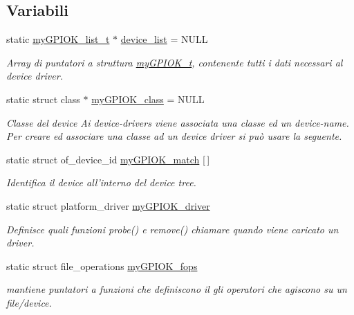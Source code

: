 \subsection*{Variabili}
\begin{DoxyCompactItemize}
\item 
static \hyperlink{structmy_g_p_i_o_k__list__t}{my\+G\+P\+I\+O\+K\+\_\+list\+\_\+t} $\ast$ \hyperlink{group___linux-_driver_ga1deed297d5c8afeb9703965d37d3be5b}{device\+\_\+list} = N\+U\+L\+L
\begin{DoxyCompactList}\small\item\em Array di puntatori a struttura \hyperlink{structmy_g_p_i_o_k__t}{my\+G\+P\+I\+O\+K\+\_\+t}, contenente tutti i dati necessari al device driver. \end{DoxyCompactList}\item 
static struct class $\ast$ \hyperlink{group___linux-_driver_gaaf8d1bce7d6389684a037e94381c275c}{my\+G\+P\+I\+O\+K\+\_\+class} = N\+U\+L\+L
\begin{DoxyCompactList}\small\item\em Classe del device Ai device-\/drivers viene associata una classe ed un device-\/name. Per creare ed associare una classe ad un device driver si può usare la seguente. \end{DoxyCompactList}\item 
static struct of\+\_\+device\+\_\+id \hyperlink{group___linux-_driver_gab59f49dc0fe8d885c73752b8a8163d0e}{my\+G\+P\+I\+O\+K\+\_\+match} \mbox{[}$\,$\mbox{]}
\begin{DoxyCompactList}\small\item\em Identifica il device all'interno del device tree. \end{DoxyCompactList}\item 
static struct platform\+\_\+driver \hyperlink{group___linux-_driver_ga8dba1541b58fa63f8208232ffce4fc47}{my\+G\+P\+I\+O\+K\+\_\+driver}
\begin{DoxyCompactList}\small\item\em Definisce quali funzioni probe() e remove() chiamare quando viene caricato un driver. \end{DoxyCompactList}\item 
static struct file\+\_\+operations \hyperlink{group___linux-_driver_gad1963bc01fffdbb315a408a9210cbafc}{my\+G\+P\+I\+O\+K\+\_\+fops}
\begin{DoxyCompactList}\small\item\em mantiene puntatori a funzioni che definiscono il gli operatori che agiscono su un file/device. \end{DoxyCompactList}\end{DoxyCompactItemize}


